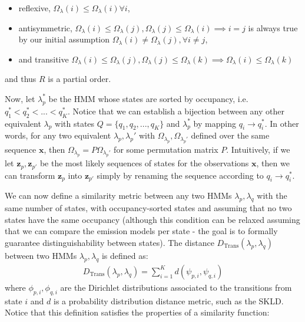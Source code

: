 \documentclass[pdftex,11pt,a4paper]{article}
\theoremstyle{definition}
\theoremstyle{remark}
\newcommand*{\V}[1]{\mathbf{#1}}%
\begin{document}
\begin{itemize}
\item reflexive, $\Omega_\lambda(i) \leq \Omega_\lambda(i) \forall i$,
\item antisymmetric, $\Omega_\lambda(i) \leq \Omega_\lambda(j), \Omega_\lambda(j) \leq \Omega_\lambda(i) \implies i = j$ is always true by our initial assumption $\Omega_\lambda(i) \neq \Omega_\lambda(j), \forall i\neq j$,
\item and transitive $\Omega_\lambda(i) \leq \Omega_\lambda(j), \Omega_\lambda(j) \leq \Omega_\lambda(k) \implies \Omega_\lambda(i) \leq \Omega_\lambda(k)$
\end{itemize}
and thus $R$ is a partial order.
\par Now, let $\lambda_p^\text{*}$ be the HMM whose states are sorted by occupancy, i.e. $q_1^\text{*} < q_2^\text{*} < ... < q_K^\text{*}$. Notice that we can establish a bijection between any other equivalent $\lambda_p$ with states $Q = \{q_1, q_2, ..., q_K\}$ and $\lambda_p^\text{*}$ by mapping $q_i \rightarrow q_i^\text{*}$. In other words, for any two equivalent $\lambda_p, \lambda_p'$ with $\Omega_{\lambda_p}, \Omega_{\lambda_p'}$ defined over the same sequence $\V{x}$, then $\Omega_{\lambda_p} = P\Omega_{\lambda_p'}$ for some permutation matrix $P$. Intuitively, if we let $\V{z}_p, \V{z}_{p'}$ be the most likely sequences of states for the observations $\V{x}$, then we can transform $\V{z}_p$ into $\V{z}_{p'}$ simply by renaming the sequence according to $q_i \rightarrow q_i^\text{*}$. 
\par We can now define a similarity metric between any two HMMs $\lambda_p, \lambda_q$ with the same number of states, with occupancy-sorted states and assuming that no two states have the same occupancy (although this condition can be relaxed assuming that we can compare the emission models per state - the goal is to formally guarantee distinguishability between states). The distance $D_{\text{Trans}}(\lambda_p, \lambda_q)$ between two HMMs $\lambda_p, \lambda_q$ is defined as:
\begin{align*}
D_{\text{Trans}}(\lambda_p, \lambda_q) = \sum_{i=1}^K d(\psi_{p, i}, \psi_{q, i})
\end{align*}
where $\phi_{p, i}, \phi_{q, i}$ are the Dirichlet distributions associated to the transitions from state $i$ and $d$ is a probability distribution distance metric, such as the SKLD. Notice that this definition satisfies the properties of a similarity function:
\end{document}
